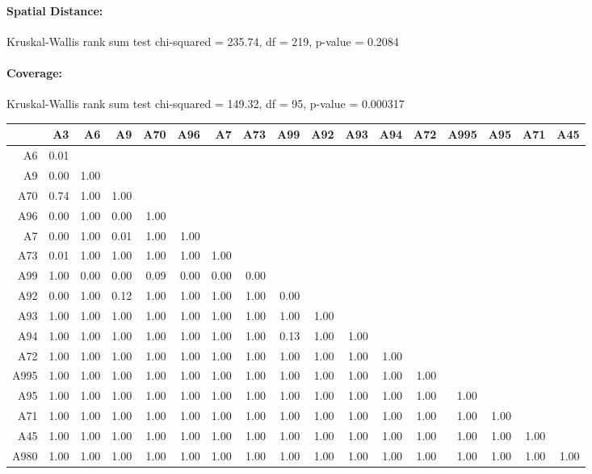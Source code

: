 \paragraph{Spatial Distance:}
Kruskal-Wallis rank sum test chi-squared = 235.74, df = 219, p-value = 0.2084

\paragraph{Coverage:}
Kruskal-Wallis rank sum test chi-squared = 149.32, df = 95, p-value = 0.000317

\begin{table}[ht]
	\tiny
	\setlength{\tabcolsep}{4pt}
	\centering
	\begin{tabular}{rrrrrrrrrrrrrrrrr}
	  	\toprule
		& A3 & A6 & A9 & A70 & A96 & A7 & A73 & A99 & A92 & A93 & A94 & A72 & A995 & A95 & A71 & A45 \\ 
	  	\midrule
		A6 & 0.01 &  &  &  &  &  &  &  &  &  &  &  &  &  &  &  \\ 
	  	A9 & 0.00 & 1.00 &  &  &  &  &  &  &  &  &  &  &  &  &  &  \\ 
	  	A70 & 0.74 & 1.00 & 1.00 &  &  &  &  &  &  &  &  &  &  &  &  &  \\ 
	  	A96 & 0.00 & 1.00 & 0.00 & 1.00 &  &  &  &  &  &  &  &  &  &  &  &  \\ 
	  	A7 & 0.00 & 1.00 & 0.01 & 1.00 & 1.00 &  &  &  &  &  &  &  &  &  &  &  \\ 
	  	A73 & 0.01 & 1.00 & 1.00 & 1.00 & 1.00 & 1.00 &  &  &  &  &  &  &  &  &  &  \\ 
	  	A99 & 1.00 & 0.00 & 0.00 & 0.09 & 0.00 & 0.00 & 0.00 &  &  &  &  &  &  &  &  &  \\ 
	  	A92 & 0.00 & 1.00 & 0.12 & 1.00 & 1.00 & 1.00 & 1.00 & 0.00 &  &  &  &  &  &  &  &  \\ 
	  	A93 & 1.00 & 1.00 & 1.00 & 1.00 & 1.00 & 1.00 & 1.00 & 1.00 & 1.00 &  &  &  &  &  &  &  \\ 
	  	A94 & 1.00 & 1.00 & 1.00 & 1.00 & 1.00 & 1.00 & 1.00 & 0.13 & 1.00 & 1.00 &  &  &  &  &  &  \\ 
	  	A72 & 1.00 & 1.00 & 1.00 & 1.00 & 1.00 & 1.00 & 1.00 & 1.00 & 1.00 & 1.00 & 1.00 &  &  &  &  &  \\ 
	  	A995 & 1.00 & 1.00 & 1.00 & 1.00 & 1.00 & 1.00 & 1.00 & 1.00 & 1.00 & 1.00 & 1.00 & 1.00 &  &  &  &  \\ 
	  	A95 & 1.00 & 1.00 & 1.00 & 1.00 & 1.00 & 1.00 & 1.00 & 1.00 & 1.00 & 1.00 & 1.00 & 1.00 & 1.00 &  &  &  \\ 
	  	A71 & 1.00 & 1.00 & 1.00 & 1.00 & 1.00 & 1.00 & 1.00 & 1.00 & 1.00 & 1.00 & 1.00 & 1.00 & 1.00 & 1.00 &  &  \\ 
	  	A45 & 1.00 & 1.00 & 1.00 & 1.00 & 1.00 & 1.00 & 1.00 & 1.00 & 1.00 & 1.00 & 1.00 & 1.00 & 1.00 & 1.00 & 1.00 &  \\ 
	  	A980 & 1.00 & 1.00 & 1.00 & 1.00 & 1.00 & 1.00 & 1.00 & 1.00 & 1.00 & 1.00 & 1.00 & 1.00 & 1.00 & 1.00 & 1.00 & 1.00 \\ 
	   	\bottomrule
	\end{tabular}
\end{table}

